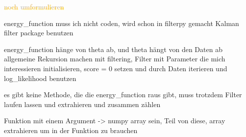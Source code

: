 \textcolor{orange}{noch umformulieren}



energy_function muss ich nicht coden, wird schon in filterpy gemacht
Kalman filter package benutzen

energy_function hänge von theta ab, und theta hängt von den Daten ab
allgemeine Rekursion machen mit filtering, Filter mit Parameter die mich interessieren initialisieren, score = 0 setzen und durch Daten iterieren und log_likelihood benutzen

es gibt keine Methode, die die energy_function raus gibt, muss trotzdem Filter laufen lassen und extrahieren und zusammen zählen

Funktion mit einem Argument -> numpy array sein, Teil von diese, array extrahieren um in der Funktion zu brauchen 


